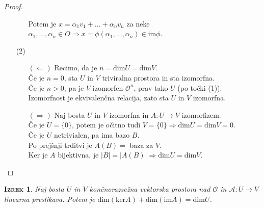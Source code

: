 \documentclass[a4paper,12pt]{article}
\newcommand{\A}{\mathcal{A}}
\newtheorem*{izrek}{\textsc{Izrek}}
\begin{document}
\begin{proof}
\begin{enumerate}
\begin{itemize}
Potem je $x=\alpha_1v_1+\ldots+\alpha_nv_n$ za neke $\alpha_1,\ldots,\alpha_n\in O \Rightarrow x=\phi(\alpha_1,\ldots,\alpha_n)\in \text{im}\phi$.\\
\end{itemize}
\newpage
\item[(2)]
\begin{itemize}
\item[$(\Leftarrow)$]
Recimo, da je $n=\text{dim}U=\text{dim}V$.\\

Če je $n=0$, sta $U$ in $V$ triviralna prostora in sta izomorfna. \\

Če je $n>0$, pa je $V$ izomorfen $\mathcal{O} ^n$, prav tako $U$ (po točki (1)).\\

Izomorfnost je ekvivalenčna relacija, zato sta $U$ in $V$ izomorfna.\\

\item[$(\Rightarrow)$]
Naj bosta $U$ in $V$ izomorfna in $A:U\to V$ izomorfizem. \\

Če je $U=\{0\}$, potem je očitno tudi $V=\{0\}\Rightarrow \text{dim}U=\text{dim}V=0$. \\

Če je $U$ netrivialen, pa ima bazo $B$.\\

Po prejšnji trditvi je $A(B)=$ baza za $V$.\\

Ker je $A$ bijektivna, je $|B|=|A(B)|\Rightarrow \text{dim}U=\text{dim}V$.
\end{itemize}
\end{enumerate}
\end{proof}

\begin{izrek}
Naj bosta $U$ in $V$ končnorazsežna vektorska prostora nad $\mathcal{O}$ in $\A :U\to V$ linearna preslikava. Potem je $\text{dim}(\text{ker}A)+\text{dim}(\text{im}A)=\text{dim}U$.\\
\end{izrek}
\end{document}
